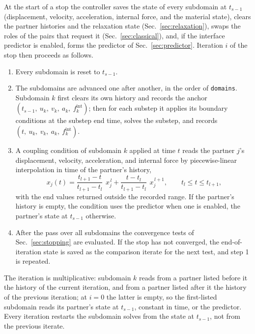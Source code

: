 \documentclass[11pt]{article}
\newcommand{\code}[1]{\texttt{#1}}
\begin{document}
At the start of a stop the controller saves the state of every subdomain
at $t_{s-1}$ (displacement, velocity, acceleration, internal force, and the
material state), clears the partner histories and the relaxation state
(Sec.~\ref{sec:relaxation}), swaps the roles of the pairs that request it
(Sec.~\ref{sec:classical}), and, if the interface predictor is enabled,
forms the predictor of Sec.~\ref{sec:predictor}. Iteration $i$ of the stop
then proceeds as follows.
\begin{enumerate}[itemsep=2pt]
\item Every subdomain is reset to $t_{s-1}$.
\item The subdomains are advanced one after another, in the order of
  \code{domains}. Subdomain $k$ first clears its own history and records
  the anchor $(t_{s-1}, ~u_k, ~v_k, ~a_k, ~f^{\mathrm{int}}_k)$; then for
  each substep it applies its boundary conditions at the substep end time,
  solves the substep, and records $(t, ~u_k, ~v_k, ~a_k, ~f^{\mathrm{int}}_k)$.
\item A coupling condition of subdomain $k$ applied at time $t$ reads the
  partner $j$'s displacement, velocity, acceleration, and internal force by
  piecewise-linear interpolation in time of the partner's history,
  \begin{equation}
    ~x_j(t) = \frac{t_{l+1} - t}{t_{l+1} - t_l}\, ~x_j^{\,l}
            + \frac{t - t_l}{t_{l+1} - t_l}\, ~x_j^{\,l+1},
    \qquad t_l \le t \le t_{l+1},
    \label{eq:interp}
  \end{equation}
  with the end values returned outside the recorded range. If the partner's
  history is empty, the condition uses the predictor when one is enabled,
  the partner's state at $t_{s-1}$ otherwise.
\item After the pass over all subdomains the convergence tests of
  Sec.~\ref{sec:stopping} are evaluated. If the stop has not converged, the
  end-of-iteration state is saved as the comparison iterate for the next
  test, and step 1 is repeated.
\end{enumerate}
The iteration is multiplicative: subdomain $k$ reads from a partner listed
before it the history of the current iteration, and from a partner listed
after it the history of the previous iteration; at $i = 0$ the latter is
empty, so the first-listed subdomain reads its partner's state at
$t_{s-1}$, constant in time, or the predictor. Every iteration restarts
the subdomain solves from the state at $t_{s-1}$, not from the previous
iterate.
\end{document}
